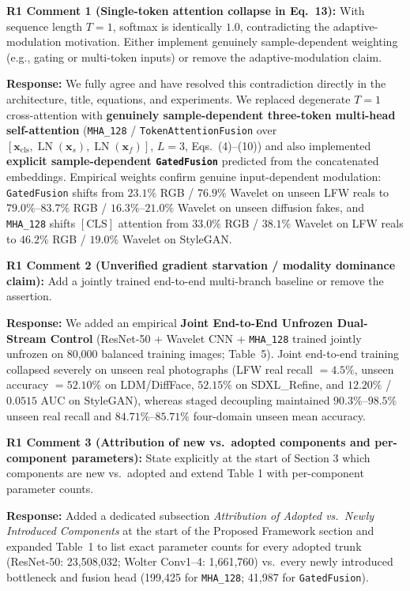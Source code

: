 \documentclass[11pt,a4paper]{article}
\newcommand{\reviewercomment}[2]{%
  \vspace{0.6em}\noindent\begin{tcolorbox}[colback=boxbg,colframe=revcolor,boxrule=0.6pt,left=6pt,right=6pt,top=4pt,bottom=4pt]
  \textbf{\color{revcolor}#1:} #2
  \end{tcolorbox}
}
\newcommand{\authorresponse}[1]{%
  \noindent\textbf{\color{respcolor}Response:} #1\par\vspace{0.5em}
}
\begin{document}
\reviewercomment{R1 Comment 1 (Single-token attention collapse in Eq.\ 13)}{With sequence length $T=1$, softmax is identically $1.0$, contradicting the adaptive-modulation motivation. Either implement genuinely sample-dependent weighting (e.g., gating or multi-token inputs) or remove the adaptive-modulation claim.}
\authorresponse{We fully agree and have resolved this contradiction directly in the architecture, title, equations, and experiments. We replaced degenerate $T=1$ cross-attention with \textbf{genuinely sample-dependent three-token multi-head self-attention} (\texttt{MHA\_128} / \texttt{TokenAttentionFusion} over $[\mathbf{x}_{\text{cls}}, \operatorname{LN}(\mathbf{x}_s), \operatorname{LN}(\mathbf{x}_f)]$, $L=3$, Eqs.\ (4)--(10)) and also implemented \textbf{explicit sample-dependent \texttt{GatedFusion}} predicted from the concatenated embeddings. Empirical weights confirm genuine input-dependent modulation: \texttt{GatedFusion} shifts from $23.1\%$ RGB / $76.9\%$ Wavelet on unseen LFW reals to $79.0\%$--$83.7\%$ RGB / $16.3\%$--$21.0\%$ Wavelet on unseen diffusion fakes, and \texttt{MHA\_128} shifts $[\text{CLS}]$ attention from $33.0\%$ RGB / $38.1\%$ Wavelet on LFW reals to $46.2\%$ RGB / $19.0\%$ Wavelet on StyleGAN.}

\reviewercomment{R1 Comment 2 (Unverified gradient starvation / modality dominance claim)}{Add a jointly trained end-to-end multi-branch baseline or remove the assertion.}
\authorresponse{We added an empirical \textbf{Joint End-to-End Unfrozen Dual-Stream Control} (ResNet-50 + Wavelet CNN + \texttt{MHA\_128} trained jointly unfrozen on 80,000 balanced training images; Table~5). Joint end-to-end training collapsed severely on unseen real photographs (LFW real recall $=4.5\%$, unseen accuracy $=52.10\%$ on LDM/DiffFace, $52.15\%$ on SDXL\_Refine, and $12.20\%$ / $0.0515$ AUC on StyleGAN), whereas staged decoupling maintained $90.3\%$--$98.5\%$ unseen real recall and $84.71\%$--$85.71\%$ four-domain unseen mean accuracy.}

\reviewercomment{R1 Comment 3 (Attribution of new vs.\ adopted components and per-component parameters)}{State explicitly at the start of Section 3 which components are new vs.\ adopted and extend Table 1 with per-component parameter counts.}
\authorresponse{Added a dedicated subsection \textit{Attribution of Adopted vs.\ Newly Introduced Components} at the start of the Proposed Framework section and expanded Table~1 to list exact parameter counts for every adopted trunk (ResNet-50: 23,508,032; Wolter Conv1--4: 1,661,760) vs.\ every newly introduced bottleneck and fusion head (199,425 for \texttt{MHA\_128}; 41,987 for \texttt{GatedFusion}).}
\end{document}
